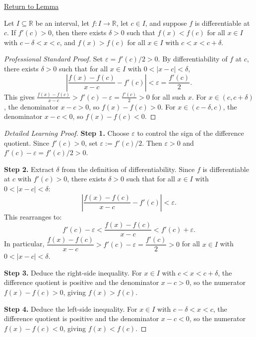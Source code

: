 \newpage
{}
\label{prf:positive-derivative-implies-locally-increasing}

\begin{remark*}[Return]
\hyperref[lem:positive-derivative-implies-locally-increasing]{Return to Lemma}
\end{remark*}

\begin{lemma*}
Let $I \subseteq \mathbb{R}$ be an interval, let $f : I \to \mathbb{R}$, let $c \in I$, and suppose $f$ is differentiable at $c$. If $f'(c) > 0$, then there exists $\delta > 0$ such that $f(x) < f(c)$ for all $x \in I$ with $c - \delta < x < c$, and $f(x) > f(c)$ for all $x \in I$ with $c < x < c + \delta$.
\end{lemma*}

\begin{proof}[Professional Standard Proof]
\LRAProofBodyStart
Set $\varepsilon = f'(c)/2 > 0$. By differentiability of $f$ at $c$, there exists $\delta > 0$ such that for all $x \in I$ with $0 < |x-c| < \delta$,
\[
\left|\frac{f(x)-f(c)}{x-c} - f'(c)\right| < \varepsilon = \frac{f'(c)}{2}.
\]
This gives $\frac{f(x)-f(c)}{x-c} > f'(c) - \varepsilon = \frac{f'(c)}{2} > 0$ for all such $x$. For $x \in (c, c+\delta)$, the denominator $x - c > 0$, so $f(x) - f(c) > 0$. For $x \in (c-\delta, c)$, the denominator $x - c < 0$, so $f(x) - f(c) < 0$.
\end{proof}

\begin{proof}[Detailed Learning Proof]
\LRAProofBodyStart

\textbf{Step 1.} Choose $\varepsilon$ to control the sign of the difference quotient. Since $f'(c) > 0$, set $\varepsilon := f'(c)/2$. Then $\varepsilon > 0$ and $f'(c) - \varepsilon = f'(c)/2 > 0$.

\textbf{Step 2.} Extract $\delta$ from the definition of differentiability. Since $f$ is differentiable at $c$ with $f'(c) > 0$, there exists $\delta > 0$ such that for all $x \in I$ with $0 < |x-c| < \delta$:
\[
\left|\frac{f(x)-f(c)}{x-c} - f'(c)\right| < \varepsilon.
\]
This rearranges to:
\[
f'(c) - \varepsilon < \frac{f(x)-f(c)}{x-c} < f'(c) + \varepsilon.
\]
In particular, $\dfrac{f(x)-f(c)}{x-c} > f'(c) - \varepsilon = \dfrac{f'(c)}{2} > 0$ for all $x \in I$ with $0 < |x-c| < \delta$.

\textbf{Step 3.} Deduce the right-side inequality. For $x \in I$ with $c < x < c+\delta$, the difference quotient is positive and the denominator $x - c > 0$, so the numerator $f(x) - f(c) > 0$, giving $f(x) > f(c)$.

\textbf{Step 4.} Deduce the left-side inequality. For $x \in I$ with $c - \delta < x < c$, the difference quotient is positive and the denominator $x - c < 0$, so the numerator $f(x) - f(c) < 0$, giving $f(x) < f(c)$.
\end{proof}

